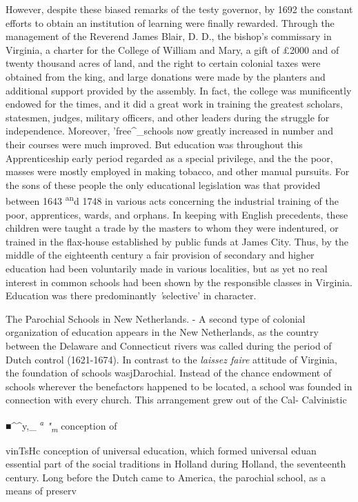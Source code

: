 \documentclass[]{book}
\begin{document}
However, despite these biased remarks of the testy governor, by 1692 the constant efforts to obtain an institution of learning were finally rewarded. Through the management of the Reverend James Blair, D. D., the bishop's commissary in Virginia, a charter for the College of William and Mary, a gift of £2000 and of twenty thousand acres of land, and the right to certain colonial taxes were obtained from the king, and large donations were made by the planters and additional support provided by the assembly. In fact, the college was munificently endowed for the times, and it did a great work in training the greatest scholars, statesmen, judges, military officers, and other leaders during the struggle for independence. Moreover, 'free\^{}\_schools\protect\hypertarget{ch17.xmlux5cux23para.248.1.0.box.135.239.1262.955.q.60}{}{ now greatly increased in number and their courses were much improved. But education was throughout this Apprenticeship early period regarded as a special privilege, and the the poor, masses were mostly employed in making tobacco, and other manual pursuits. For the sons of these people the only educational legislation was that provided between 1643 \textsuperscript{an}d 1748 in various acts concerning the industrial training of the poor, apprentices, wards, and orphans. In keeping with English precedents, these children were taught a trade by the masters to whom they were indentured, or trained in the flax-house established by public funds at James City. Thus, by the middle of the eighteenth century a fair provision of secondary and higher education had been voluntarily made in various localities, but as yet no real interest in common schools had been shown by the responsible classes in Virginia. Education was there predominantly \emph{'}selective' in character.}

The Parochial Schools in New Netherlands. - A second type of colonial organization of education appears in the New Netherlands, as the country between the Delaware and Connecticut rivers was called during the period of Dutch control (1621-1674). In contrast to the \emph{laissez faire} attitude of Virginia, the foundation of schools wasjDarochial. Instead of the chance endowment of schools wherever the benefactors happened to be located, a school was founded in connection with every church. This arrangement grew out of the Cal- Calvinistic

■\^{}\^{}y,\_ \emph{\textsuperscript{a} "\textsubscript{m}} conception of

vinTsHc conception of universal education, which formed universal eduan essential part of the social traditions in Holland during Holland, the seventeenth century. Long before the Dutch came to America, the parochial school, as a means of preserv
\end{document}
